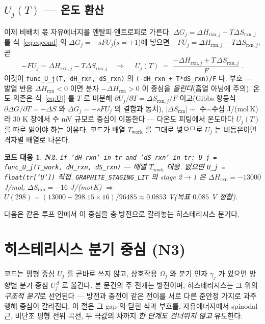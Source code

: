 \documentclass[11pt,a4paper]{article}
\newtheorem*{codebox}{코드 대응}
\newcommand{\rxn}{\mathrm{rxn}}
\newcommand{\work}{\mathrm{work}}
\newcommand{\code}[1]{\texttt{#1}}
\begin{document}
\subsection{$U_j(T)$ — 온도 환산}
이제 비배치 몫 자유에너지를 엔탈피$\cdot$엔트로피로 가른다. $\Delta G_j=\Delta H_{\rxn,j}-T\Delta S_{\rxn,j}$ 를
식~\eqref{eq:eqcond} 의 $\Delta G_j=-sFU_j$($s=+1$)에 넣으면 $-FU_j=\Delta H_{\rxn,j}-T\Delta S_{\rxn,j}$, 곧
\begin{equation}
-FU_j=\Delta H_{\rxn,j}-T\Delta S_{\rxn,j}
\quad\Longrightarrow\quad
\boxed{\;U_j(T)\;=\;\frac{-\Delta H_{\rxn,j}+T\,\Delta S_{\rxn,j}}{F}\;.}
\label{eq:Uj}
\end{equation}
이것이 \code{func\_U\_j(T, dH\_rxn, dS\_rxn)} 의 \code{(-dH\_rxn + T*dS\_rxn)/F} 다. 부호 — 발열 반응
$\Delta H_\rxn<0$ 이면 분자 $-\Delta H_\rxn>0$ 이 중심을 \emph{올린다}(흡열 아님에 주의). 온도 의존은 식~\eqref{eq:Uj}
를 $T$ 로 미분해 $\partial U_j/\partial T=\Delta S_{\rxn,j}/F$ 이고(Gibbs 항등식 $\partial\Delta G/\partial T=-\Delta S$
와 $\Delta G_j=-sFU_j$ 의 결합과 동치), $|\Delta S_\rxn|\sim$ 수$\sim$수십 J/(mol\,K) 라 $30$ K 창에서 수 mV 규모로
중심이 이동한다 — 다온도 피팅에서 온도마다 $U_j(T)$ 를 따로 읽어야 하는 이유다. 코드가 배열 $T_\work$ 를 그대로
넣으므로 $U_j$ 는 비등온이면 격자별 배열로 나온다.

\begin{codebox}
\textbf{N2.} \code{if 'dH\_rxn' in tr and 'dS\_rxn' in tr: U\_j = func\_U\_j(T\_work, dH\_rxn, dS\_rxn)}
— 배열 $T_\work$ 대응. 없으면 \code{U\_j = float(tr['U'])} 직접. \code{GRAPHITE\_STAGING\_LIT} 의 stage 2$\to$1 은
$\Delta H_\rxn=-13000$ J/mol, $\Delta S_\rxn=-16$ J/(mol\,K) $\Rightarrow$ $U(298)=(13000-298.15\times16)/96485
\approx0.0853$ V(목표 $0.085$ V 정합).
\end{codebox}

다음은 같은 루프 안에서 이 중심을 충$\cdot$방전으로 갈라놓는 히스테리시스 분기다.

\section{히스테리시스 분기 중심 (N3)}\label{sec:hys}
코드는 평형 중심 $U_j$ 를 곧바로 쓰지 않고, 상호작용 $\Omega_j$ 와 분기 인자 $\gamma_j$ 가 있으면 방향별 분기 중심
$U_j^{\,d}$ 로 옮긴다. 본 문건의 주 전개는 방전이며, 히스테리시스는 그 위의 \emph{구조적 분기}로 선언된다 — 방전과 충전이
같은 전이를 서로 다른 준안정 가지로 과주행해 중심이 갈라진다. 이 절은 그 gap 의 닫힌 식과 부호를, 자유에너지에서
spinodal 근, 비단조 평형 전위 곡선, 두 극값의 차까지 \emph{한 단계도 건너뛰지 않고} 유도한다.
\end{document}
